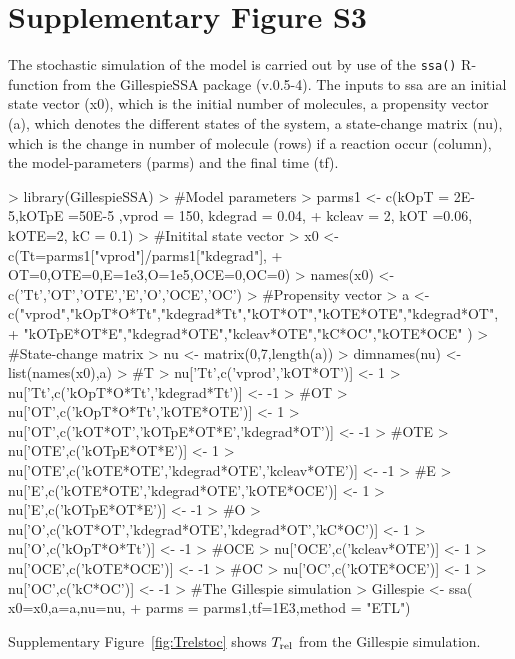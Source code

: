 \documentclass[a4paper,11pt]{article}
\newcommand{\Trel}{T_{\rm{rel}}}
\begin{document}
\section{Supplementary Figure S3}
The stochastic simulation of the model is carried out by use of the \texttt{ssa()} R-function from the GillespieSSA package (v.0.5-4). The inputs to ssa are an initial state vector (x0), which is the initial number of molecules, a propensity vector (a), which denotes the different states of the system, a state-change matrix (nu), which is the change in number of molecule (rows) if a reaction occur (column), the model-parameters (parms) and the final time (tf).
\begin{Schunk}
\begin{Sinput}
> library(GillespieSSA)
> #Model parameters
> parms1 <- c(kOpT = 2E-5,kOTpE =50E-5 ,vprod = 150,  kdegrad = 0.04,		  
+               kcleav = 2, kOT =0.06, kOTE=2, kC = 0.1)
> #Initital state vector
> x0 <- c(Tt=parms1["vprod"]/parms1["kdegrad"],
+         OT=0,OTE=0,E=1e3,O=1e5,OCE=0,OC=0)
> names(x0) <- c('Tt','OT','OTE','E','O','OCE','OC')
> #Propensity vector
> a <-  c("vprod","kOpT*O*Tt","kdegrad*Tt","kOT*OT","kOTE*OTE","kdegrad*OT",
+         "kOTpE*OT*E","kdegrad*OTE","kcleav*OTE","kC*OC","kOTE*OCE" )
> #State-change matrix
> nu <- matrix(0,7,length(a))
> dimnames(nu) <- list(names(x0),a)
> #T
> nu['Tt',c('vprod','kOT*OT')] <- 1
> nu['Tt',c('kOpT*O*Tt','kdegrad*Tt')] <- -1 
> #OT
> nu['OT',c('kOpT*O*Tt','kOTE*OTE')] <- 1
> nu['OT',c('kOT*OT','kOTpE*OT*E','kdegrad*OT')] <- -1
> #OTE
> nu['OTE',c('kOTpE*OT*E')] <- 1
> nu['OTE',c('kOTE*OTE','kdegrad*OTE','kcleav*OTE')] <- -1
> #E
> nu['E',c('kOTE*OTE','kdegrad*OTE','kOTE*OCE')] <- 1
> nu['E',c('kOTpE*OT*E')] <- -1
> #O
> nu['O',c('kOT*OT','kdegrad*OTE','kdegrad*OT','kC*OC')] <- 1
> nu['O',c('kOpT*O*Tt')] <- -1
> #OCE
> nu['OCE',c('kcleav*OTE')] <- 1
> nu['OCE',c('kOTE*OCE')] <- -1
> #OC
> nu['OC',c('kOTE*OCE')] <- 1
> nu['OC',c('kC*OC')] <- -1
> #The Gillespie simulation
> Gillespie <- ssa( x0=x0,a=a,nu=nu,
+       parms = parms1,tf=1E3,method = "ETL")
\end{Sinput}
\end{Schunk}
Supplementary Figure~\ref{fig:Trelstoc} shows $\Trel$ from the Gillespie simulation.
\end{document}
